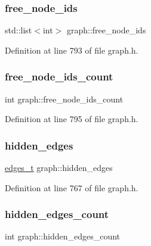 \subsubsection{\texorpdfstring{free\+\_\+node\+\_\+ids}{free\_node\_ids}}
{\footnotesize\ttfamily std\+::list$<$int$>$ graph\+::free\+\_\+node\+\_\+ids\hspace{0.3cm}{\ttfamily [private]}}



Definition at line 793 of file graph.\+h.

\mbox{\label{classgraph_a9480e2310fe64c3a8ad295bb3f119772}} 
\subsubsection{\texorpdfstring{free\+\_\+node\+\_\+ids\+\_\+count}{free\_node\_ids\_count}}
{\footnotesize\ttfamily int graph\+::free\+\_\+node\+\_\+ids\+\_\+count\hspace{0.3cm}{\ttfamily [private]}}



Definition at line 795 of file graph.\+h.

\mbox{\label{classgraph_a0d3da33d047ba7cdc3dc68b5d9c84b88}} 
\subsubsection{\texorpdfstring{hidden\+\_\+edges}{hidden\_edges}}
{\footnotesize\ttfamily \mbox{\hyperlink{edge_8h_a8f9587479bda6cf612c103494b3858e3}{edges\+\_\+t}} graph\+::hidden\+\_\+edges\hspace{0.3cm}{\ttfamily [private]}}



Definition at line 767 of file graph.\+h.

\mbox{\label{classgraph_a3151f544e049fbd985204ca9d8f74c97}} 
\subsubsection{\texorpdfstring{hidden\+\_\+edges\+\_\+count}{hidden\_edges\_count}}
{\footnotesize\ttfamily int graph\+::hidden\+\_\+edges\+\_\+count\hspace{0.3cm}{\ttfamily [private]}}




